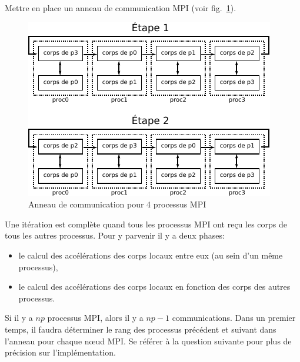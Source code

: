 \begin{questions}
	\question Mettre en place un anneau de communication MPI (voir fig.~\ref{fig:anneau}).
	\begin{figure}[htbp]
		\centering
		\includegraphics[width=0.6\linewidth]{schemas/anneau_sans_buffering.pdf}
		\caption{Anneau de communication pour 4 processus MPI}
		\label{fig:anneau}
	\end{figure}
	\begin{solution}
		Une itération est complète quand tous les processus MPI ont reçu les corps de tous les autres processus.
		Pour y parvenir il y a deux phases:
		\begin{itemize}
			\item le calcul des accélérations des corps locaux entre eux (au sein d'un même processus),
			\item le calcul des accélérations des corps locaux en fonction des corps des autres processus.
		\end{itemize}
		Si il y a $np$ processus MPI, alors il y a $np-1$ communications.
		Dans un premier temps, il faudra déterminer le rang des processus précédent et suivant dans l'anneau pour chaque n\oe ud MPI.
		Se référer à la question suivante pour plus de précision sur l'implémentation.
	\end{solution}


\end{questions}
